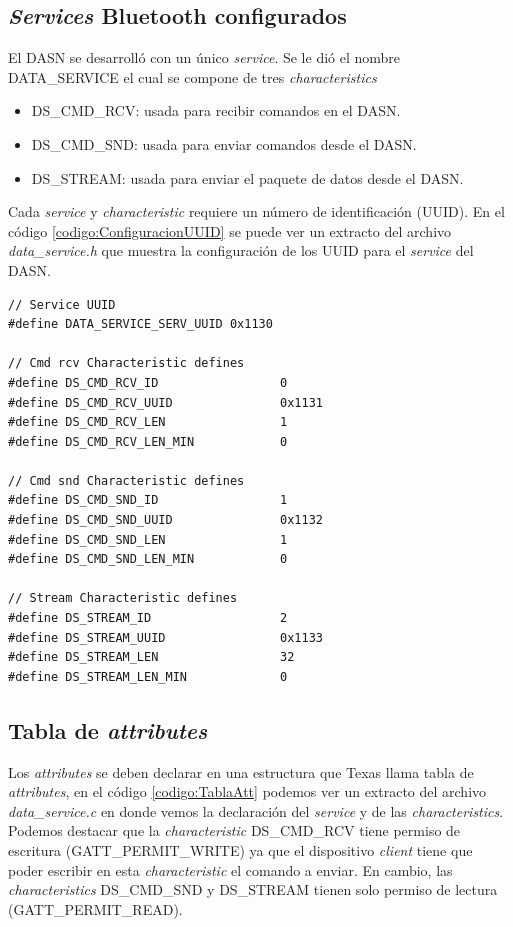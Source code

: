 \subsection{\textit{Services} Bluetooth configurados}
El DASN se desarrolló con un único \textit{service}. Se le dió el nombre DATA\_SERVICE el cual se compone de tres \textit{characteristics} 
\begin{itemize}
\item DS\_CMD\_RCV: usada para recibir comandos en el DASN.
\item DS\_CMD\_SND: usada para enviar comandos desde el DASN.
\item DS\_STREAM: usada para enviar el paquete de datos desde el DASN.
\end{itemize}

Cada \textit{service} y \textit{characteristic} requiere un número de identificación (UUID). En el código \ref{codigo:ConfiguracionUUID} se puede ver un extracto del archivo \textit{data\_service.h} que muestra la configuración de los UUID para el \textit{service} del DASN.

\begin{lstlisting}[caption= Configuración UUID , firstnumber=65 , label=codigo:ConfiguracionUUID]	
// Service UUID
#define DATA_SERVICE_SERV_UUID 0x1130

// Cmd rcv Characteristic defines
#define DS_CMD_RCV_ID                 0
#define DS_CMD_RCV_UUID               0x1131
#define DS_CMD_RCV_LEN                1
#define DS_CMD_RCV_LEN_MIN            0

// Cmd snd Characteristic defines
#define DS_CMD_SND_ID                 1
#define DS_CMD_SND_UUID               0x1132
#define DS_CMD_SND_LEN                1
#define DS_CMD_SND_LEN_MIN            0

// Stream Characteristic defines
#define DS_STREAM_ID                  2
#define DS_STREAM_UUID                0x1133
#define DS_STREAM_LEN                 32
#define DS_STREAM_LEN_MIN             0
\end{lstlisting}

\subsection{Tabla de \textit{attributes}}

Los \textit{attributes} se deben declarar en una estructura que Texas llama tabla de \textit{attributes}, en el código \ref{codigo:TablaAtt} podemos ver un extracto del archivo \textit{data\_service.c} en donde vemos la declaración del \textit{service} y de las \textit{characteristics}. Podemos destacar que la \textit{characteristic} DS\_CMD\_RCV tiene permiso de escritura (GATT\_PERMIT\_WRITE) ya que el dispositivo \textit{client} tiene que poder escribir en esta \textit{characteristic} el comando a enviar. En cambio, las \textit{characteristics} DS\_CMD\_SND y DS\_STREAM tienen solo permiso de lectura (GATT\_PERMIT\_READ).

